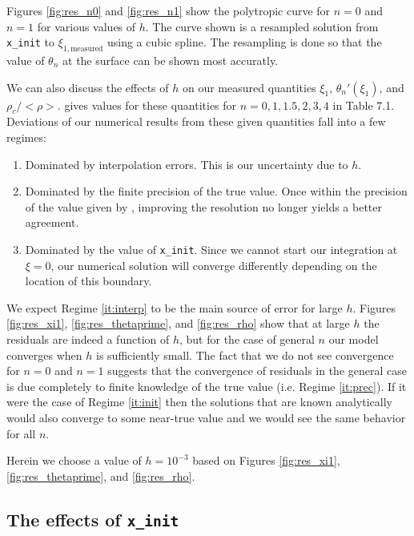 \documentclass[twocolumn]{aastex631}
\begin{document}
Figures \ref{fig:res_n0} and \ref{fig:res_n1} show the
polytropic curve for $n=0$ and $n=1$ for various
values of $h$. The curve shown is a resampled solution from
\texttt{x\_init} to $\xi_{1,\text{measured}}$ using a cubic spline.
The resampling is done so that the value of $\theta_n$ at
the surface can be shown most accuratly.

We can also discuss the effects of $h$ on our measured quantities
$\xi_1$, $\theta_n'(\xi_1)$, and $\rho_c/<\rho>$. \citet{textbook}
gives values for these quantities for $n=0,1,1.5,2,3,4$ in Table 7.1.
Deviations of our numerical results from these given quantities fall
into a few regimes:

\begin{enumerate}
    \item Dominated by interpolation errors. This is our uncertainty
    due to $h$. \label{it:interp}
    \item Dominated by the finite precision of the true value. Once
    within the precision of the value given by \citet{textbook},
    improving the resolution no longer yields a better agreement.
    \label{it:prec}
    \item Dominated by the value of \texttt{x\_init}. Since we
    cannot start our integration at $\xi=0$, our numerical solution
    will converge differently depending on the location of this boundary.
    \label{it:init}
\end{enumerate}

We expect Regime \ref{it:interp} to be the main source of error for
large $h$. Figures \ref{fig:res_xi1}, \ref{fig:res_thetaprime},
and \ref{fig:res_rho} show that at large $h$ the residuals
are indeed a function of $h$, but for the case of general $n$ our
model converges when $h$ is sufficiently small. The fact that we
do not see convergence for $n=0$ and $n=1$ suggests that the convergence
of residuals in the general case is due completely to finite knowledge
of the true value (i.e. Regime \ref{it:prec}). If it were the case of
Regime \ref{it:init} then the solutions that are known analytically
would also converge to some near-true value and we would see the same behavior
for all $n$.

Herein we choose a value of $h = 10^{-3}$ based on Figures \ref{fig:res_xi1},
\ref{fig:res_thetaprime}, and \ref{fig:res_rho}.

\subsection{The effects of \texttt{x\_init}}
\label{subsec:init}
\end{document}
